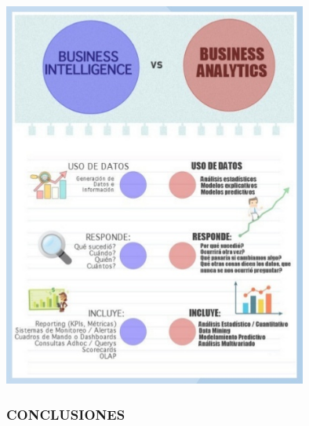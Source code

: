 \documentclass[a4paper,12pt,twocolumn]{article}
\begin{document}
\begin{center}
\includegraphics[width=10cm]{./Imagenes/image02}
\end{center}
\subsubsection*{CONCLUSIONES} 
\end{document}
